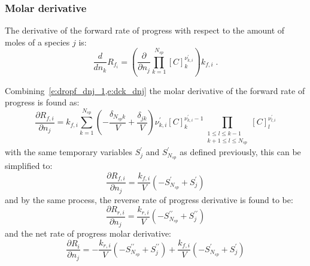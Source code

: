 \documentclass[12pt,number,sort&compress]{elsarticle}
\newcommand{\ns}{N_{sp}}
\begin{document}
\subsubsection{Molar derivative}
\label{s:dri_dnj}
The derivative of the forward rate of progress with respect to the amount of moles of a species $j$ is:
\begin{equation}
 \label{e:dropf_dnj_1}
 \frac{d}{d n_{k}} {R_{f_i}} = \left(\frac{\partial}{\partial n_{j}} \prod_{k=1}^{\ns} [C]_{k}^{\nu^{\prime}_{k,i}}\right) {k_{f, i}} \;.
\end{equation}

Combining~\cref{e:dropf_dnj_1,e:dck_dnj} the molar derivative of the forward rate of progress is found as:
\begin{equation}
 \frac{\partial {R_{f, i}} }{\partial {n_j} } = {k_{f, i}} \sum_{k=1}^{\ns} \left(- \frac{\delta_{\ns k}}{V} + \frac{\delta_{j k}}{V}\right) \nu^{\prime}_{k,i} [C]_{k}^{\nu^{\prime}_{k,i} - 1} \prod_{\substack{1 \leq l \leq k - 1\\k + 1 \leq l \leq \ns}} [C]_{l}^{\nu^{\prime}_{l,i}}
\end{equation}
with the same temporary variables $S^{\prime}_{j}$ and $S^{\prime}_{\ns}$ as defined previously, this can be simplified to:
\begin{equation}
 \label{e:dropf_dnj}
 \frac{\partial {R_{f, i}} }{\partial {n_j} } = \frac{{k_{f, i}}}{V} \left(- S^{\prime}_{\ns} + S^{\prime}_{j}\right)
\end{equation}
and by the same process, the reverse rate of progress derivative is found to be:
\begin{equation}
 \label{e:dropr_dnj}
 \frac{\partial {R_{r, i}} }{\partial {n_j} } = \frac{{k_{r, i}}}{V} \left(- S^{\prime\prime}_{\ns} + S^{\prime\prime}_{j}\right)
\end{equation}
and the net rate of progress molar derivative:
\begin{equation}
 \frac{\partial R_{i} }{\partial {n_j} } = - \frac{{k_{r, i}}}{V} \left(- S^{\prime\prime}_{\ns} + S^{\prime\prime}_{j}\right) + \frac{{k_{f, i}}}{V} \left(- S^{\prime}_{\ns} + S^{\prime}_{j}\right)
\end{equation}
\end{document}
